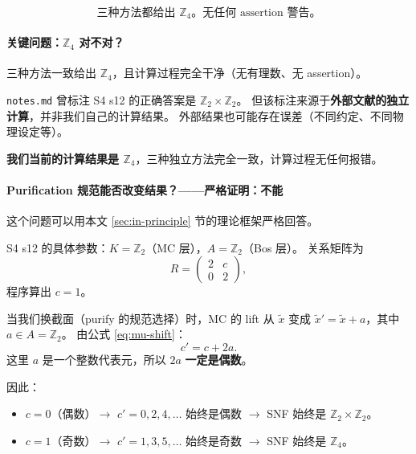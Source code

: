 \documentclass[a4paper,fontset=ubuntu,12pt]{ctexart}
\begin{document}
\begin{equation}
\boxed{\text{三种方法都给出 }\mathbb{Z}_4\text{。无任何 assertion 警告。}}
\end{equation}

\paragraph{关键问题：$\mathbb{Z}_4$ 对不对？}

三种方法一致给出 $\mathbb{Z}_4$，且计算过程完全干净（无有理数、无 assertion）。

\texttt{notes.md} 曾标注 S4 s12 的正确答案是 $\mathbb{Z}_2\times\mathbb{Z}_2$。
但该标注来源于\textbf{外部文献的独立计算}，并非我们自己的计算结果。
外部结果也可能存在误差（不同约定、不同物理设定等）。

\textbf{我们当前的计算结果是 $\mathbb{Z}_4$}，三种独立方法完全一致，计算过程无任何报错。

\paragraph{Purification 规范能否改变结果？——严格证明：不能}

这个问题可以用本文 \ref{sec:in-principle} 节的理论框架严格回答。

S4 s12 的具体参数：$K = \mathbb{Z}_2$（MC 层），$A = \mathbb{Z}_2$（Bos 层）。
关系矩阵为
\begin{equation}
R = \begin{pmatrix} 2 & c \\ 0 & 2 \end{pmatrix},
\label{eq:rmat-s4-generic}
\end{equation}
程序算出 $c=1$。

当我们换截面（purify 的规范选择）时，MC 的 lift 从 $\tilde{x}$ 变成 $\tilde{x}' = \tilde{x} + a$，其中 $a \in A = \mathbb{Z}_2$。
由公式 \eqref{eq:mu-shift}：
\begin{equation}
c' = c + 2a.
\label{eq:c-gauge-shift-s4}
\end{equation}
这里 $a$ 是一个整数代表元，所以 $2a$ \textbf{一定是偶数}。

因此：
\begin{itemize}
\item $c=0$（偶数）$\to$ $c'=0,2,4,\ldots$ 始终是偶数 $\to$ SNF 始终是 $\mathbb{Z}_2\times\mathbb{Z}_2$。
\item $c=1$（奇数）$\to$ $c'=1,3,5,\ldots$ 始终是奇数 $\to$ SNF 始终是 $\mathbb{Z}_4$。
\end{itemize}
\end{document}
